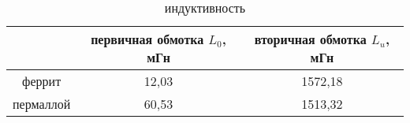 \begin{table}[h!]
    \begin{center}
        \begin{tabular}{|c|c|c|}
            \hline
                        & первичная обмотка $L_0$, мГн & вторичная обмотка $L_u$, мГн \\ \hline
            феррит      & 12,03                        & 1572,18                      \\ \hline
            пермаллой   & 60,53                        & 1513,32                      \\ \hline
        \end{tabular}
    \end{center}
    \caption{индуктивность}
\end{table}